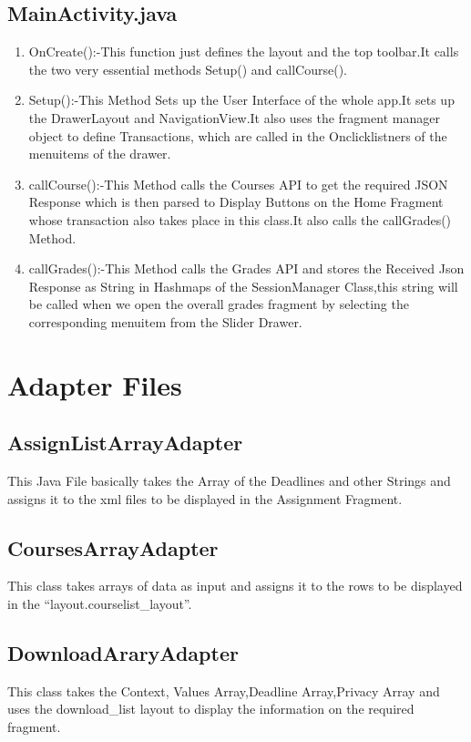 \documentclass[a4paper,man,natbib]{apa6}
\begin{document}
\subsection{MainActivity.java}
\begin{enumerate}
\item OnCreate():-This function just defines the layout and the top toolbar.It calls the two very essential methods Setup() and callCourse().
\item Setup():-This Method Sets up the User Interface of the whole app.It sets up the DrawerLayout and NavigationView.It also uses the fragment manager object to define Transactions, which are called in the Onclicklistners of the menuitems of the drawer.
\item callCourse():-This Method calls the Courses API to get the required JSON Response which is then parsed to Display Buttons on the Home Fragment whose transaction also takes place in this class.It also calls the callGrades() Method.
\item callGrades():-This Method calls the Grades API and stores the Received Json Response as String in Hashmaps of the SessionManager Class,this string will be called when we open the overall grades fragment by selecting the corresponding menuitem from the Slider Drawer.
\end{enumerate}




\section{Adapter Files}
\label{sec:examples}

\subsection{AssignListArrayAdapter}
This Java File basically takes the Array of the Deadlines and other Strings and assigns it to the xml files to be displayed in the Assignment Fragment.
\subsection{CoursesArrayAdapter}
This class takes arrays of data as input and assigns it to the rows to be displayed in the “layout.courselist\_layout”.
\subsection{DownloadAraryAdapter}
This class  takes the Context, Values Array,Deadline Array,Privacy Array and uses the download\_list layout to display the information on the required fragment.
\end{document}

